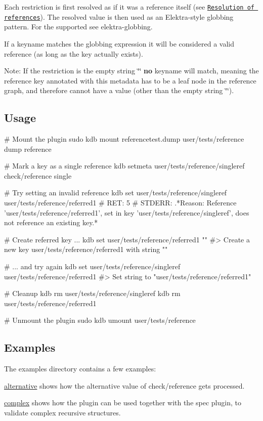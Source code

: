 Each restriction is first resolved as if it was a reference itself (see \href{#resolution-of-references}{\tt Resolution of references}). The resolved value is then used as an Elektra-\/style globbing pattern. For the supported see elektra-\/globbing.

If a keyname matches the globbing expression it will be considered a valid reference (as long as the key actually exists).

Note\+: If the restriction is the empty string {\ttfamily \char`\"{}\char`\"{}} {\bfseries no} keyname will match, meaning the reference key annotated with this metadata has to be a leaf node in the reference graph, and therefore cannot have a value (other than the empty string {\ttfamily \char`\"{}\char`\"{}}).

\subsection*{Usage}


\begin{DoxyCode}
# Mount the plugin
sudo kdb mount referencetest.dump user/tests/reference dump reference

# Mark a key as a single reference
kdb setmeta user/tests/reference/singleref check/reference single

# Try setting an invalid reference
kdb set user/tests/reference/singleref user/tests/reference/referred1
# RET: 5
# STDERR: .*Reason: Reference 'user/tests/reference/referred1', set in key
       'user/tests/reference/singleref', does not reference an existing key.*

# Create referred key ...
kdb set user/tests/reference/referred1 ""
#> Create a new key user/tests/reference/referred1 with string ""

# ... and try again
kdb set user/tests/reference/singleref user/tests/reference/referred1
#> Set string to "user/tests/reference/referred1"

# Cleanup
kdb rm user/tests/reference/singleref
kdb rm user/tests/reference/referred1

# Unmount the plugin
sudo kdb umount user/tests/reference
\end{DoxyCode}


\subsection*{Examples}

The examples directory contains a few examples\+:


\begin{DoxyItemize}
\item \hyperlink{md_src_plugins_reference_examples_alternative_README_src_plugins_reference_examples_alternative_README_md}{alternative} shows how the {\ttfamily alternative} value of {\ttfamily check/reference} gets processed.
\item \hyperlink{md_src_plugins_reference_examples_complex_README_src_plugins_reference_examples_complex_README_md}{complex} shows how the plugin can be used together with the spec plugin, to validate complex recursive structures. 
\end{DoxyItemize}